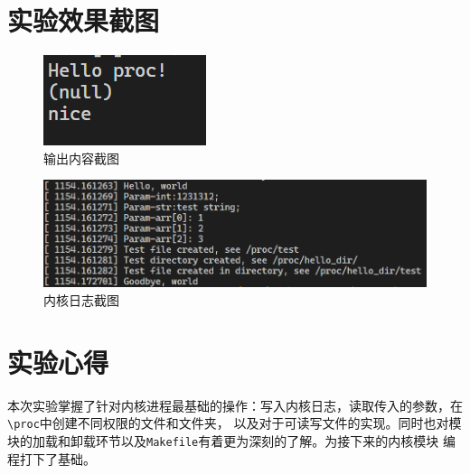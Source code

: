 \documentclass[UTF8]{ctexrep}
\begin{document}
    \section{实验效果截图}
    \begin{figure}[h!]
        \centering
        \includegraphics{output_screenshot.png}
        \caption{输出内容截图}
    \end{figure}
    \begin{figure}[h!]
        \centering
        \includegraphics{log_screenshot.png}
        \caption{内核日志截图}
    \end{figure}

    \section{实验心得}
    本次实验掌握了针对内核进程最基础的操作：写入内核日志，读取传入的参数，在\lstinline{\proc}中创建不同权限的文件和文件夹，
    以及对于可读写文件的实现。同时也对模块的加载和卸载环节以及\lstinline{Makefile}有着更为深刻的了解。为接下来的内核模块
    编程打下了基础。
\end{document}
